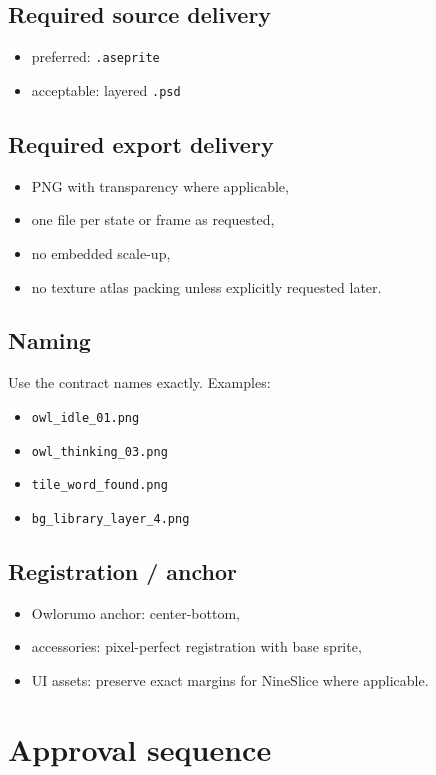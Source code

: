 \documentclass[11pt,a4paper]{article}
\begin{document}
\subsection{Required source delivery}
\begin{itemize}
  \item preferred: \texttt{.aseprite}
  \item acceptable: layered \texttt{.psd}
\end{itemize}

\subsection{Required export delivery}
\begin{itemize}
  \item PNG with transparency where applicable,
  \item one file per state or frame as requested,
  \item no embedded scale-up,
  \item no texture atlas packing unless explicitly requested later.
\end{itemize}

\subsection{Naming}
Use the contract names exactly. Examples:
\begin{itemize}
  \item \texttt{owl\_idle\_01.png}
  \item \texttt{owl\_thinking\_03.png}
  \item \texttt{tile\_word\_found.png}
  \item \texttt{bg\_library\_layer\_4.png}
\end{itemize}

\subsection{Registration / anchor}
\begin{itemize}
  \item Owlorumo anchor: center-bottom,
  \item accessories: pixel-perfect registration with base sprite,
  \item UI assets: preserve exact margins for NineSlice where applicable.
\end{itemize}

\section{Approval sequence}
\end{document}
